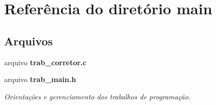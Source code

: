 \section{Referência do diretório main}
\label{dir_5c982d53a68cdbcd421152b4020263a9}
\subsection*{Arquivos}
\begin{DoxyCompactItemize}
\item 
arquivo {\bf trab\+\_\+corretor.\+c}
\item 
arquivo {\bf trab\+\_\+main.\+h}
\begin{DoxyCompactList}\small\item\em Orientações e gerenciamento dos trabalhos de programação. \end{DoxyCompactList}\end{DoxyCompactItemize}
